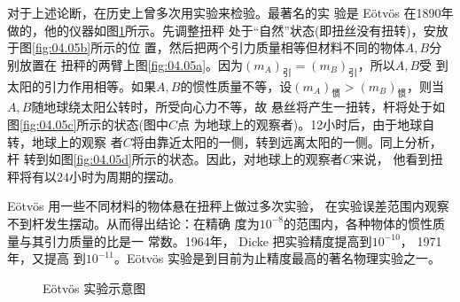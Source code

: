 对于上述论断，在历史上曾多次用实验来检验。最著名的实
验是 E\"otv\"os 在1890年做的，他的仪器如图\ref{fig:04.05}所示。先调整扭秤
处于“自然”状态(即扭丝没有扭转)，安放于图\ref{fig:04.05b}所示的位
置，然后把两个引力质量相等但材料不同的物体$ A, B $分别放置在
扭秤的两臂上\lhbrak 图\ref{fig:04.05a}\rhbrak 。因为$\left(m _ { A }\right) _ {\text{引}} = \left(m _ { B }\right) _ {\text{引}} $，所以$ A , B $受
到太阳的引力作用相等。如果$ A , B $的惯性质量不等，设$ \left(m _ { A }\right) _ {\text{惯}} > \left(m _ { B }\right) _ {\text{惯}} $，则当$ A , B $随地球绕太阳公转时，所受向心力不等，故
悬丝将产生一扭转，杆将处于如图\ref{fig:04.05c}所示的状态(图中$ C $点
为地球上的观察者)。12小时后，由于地球自转，地球上的观察
者$ C $将由靠近太阳的一侧，转到远离太阳的一侧。同上分析，杆
转到如图\ref{fig:04.05d}所示的状态。因此，对地球上的观察者$ C $来说，
他看到扭秤将有以$ 24 $小时为周期的摆动。

E\"otv\"os 用一些不同材料的物体悬在扭秤上做过多次实验，
在实验误差范围内观察不到杆发生摆动。从而得出结论：在精确
度为$ 1 0 ^ { - 8 } $的范围内，各种物体的惯性质量与其引力质量的比是一
常数。1964年， Dicke 把实验精度提高到$ 1 0 ^ { - 1 0 } $， 1971 年，又提高
到$ 1 0 ^ { - 1 1 } $。E\"otv\"os 实验是到目前为止精度最高的著名物理实验之一。
\begin{figure}[t]
  \centering
   \qquad
   \qquad
  \caption{E\"otv\"os 实验示意图}
  \label{fig:04.05}
  \vspace{-0.8em}
\end{figure}

